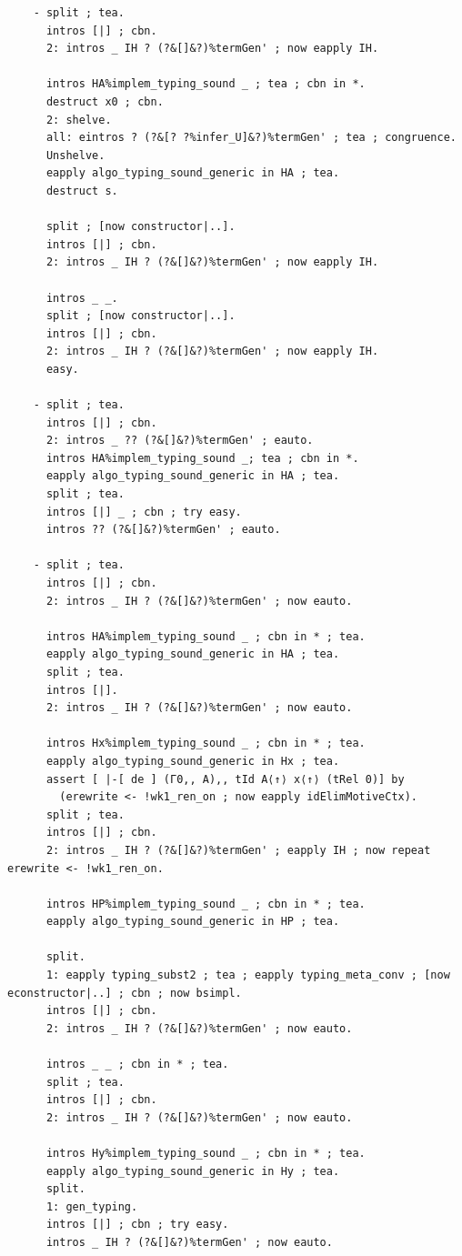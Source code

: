 \begin{lstlisting}
    - split ; tea.
      intros [|] ; cbn.
      2: intros _ IH ? (?&[]&?)%termGen' ; now eapply IH.
      
      intros HA%implem_typing_sound _ ; tea ; cbn in *.
      destruct x0 ; cbn.
      2: shelve.
      all: eintros ? (?&[? ?%infer_U]&?)%termGen' ; tea ; congruence.
      Unshelve.
      eapply algo_typing_sound_generic in HA ; tea.
      destruct s.

      split ; [now constructor|..].
      intros [|] ; cbn.
      2: intros _ IH ? (?&[]&?)%termGen' ; now eapply IH.

      intros _ _.
      split ; [now constructor|..].
      intros [|] ; cbn.
      2: intros _ IH ? (?&[]&?)%termGen' ; now eapply IH.
      easy.

    - split ; tea.
      intros [|] ; cbn.
      2: intros _ ?? (?&[]&?)%termGen' ; eauto.
      intros HA%implem_typing_sound _; tea ; cbn in *.
      eapply algo_typing_sound_generic in HA ; tea.
      split ; tea.
      intros [|] _ ; cbn ; try easy.
      intros ?? (?&[]&?)%termGen' ; eauto.

    - split ; tea.
      intros [|] ; cbn.
      2: intros _ IH ? (?&[]&?)%termGen' ; now eauto.

      intros HA%implem_typing_sound _ ; cbn in * ; tea.
      eapply algo_typing_sound_generic in HA ; tea.
      split ; tea.
      intros [|].
      2: intros _ IH ? (?&[]&?)%termGen' ; now eauto.

      intros Hx%implem_typing_sound _ ; cbn in * ; tea.
      eapply algo_typing_sound_generic in Hx ; tea.
      assert [ |-[ de ] (Γ0,, A),, tId A⟨↑⟩ x⟨↑⟩ (tRel 0)] by
        (erewrite <- !wk1_ren_on ; now eapply idElimMotiveCtx).
      split ; tea.
      intros [|] ; cbn.
      2: intros _ IH ? (?&[]&?)%termGen' ; eapply IH ; now repeat erewrite <- !wk1_ren_on.

      intros HP%implem_typing_sound _ ; cbn in * ; tea.
      eapply algo_typing_sound_generic in HP ; tea.

      split.
      1: eapply typing_subst2 ; tea ; eapply typing_meta_conv ; [now econstructor|..] ; cbn ; now bsimpl.
      intros [|] ; cbn.
      2: intros _ IH ? (?&[]&?)%termGen' ; now eauto.

      intros _ _ ; cbn in * ; tea.
      split ; tea.
      intros [|] ; cbn.
      2: intros _ IH ? (?&[]&?)%termGen' ; now eauto.

      intros Hy%implem_typing_sound _ ; cbn in * ; tea.
      eapply algo_typing_sound_generic in Hy ; tea.
      split.
      1: gen_typing.
      intros [|] ; cbn ; try easy.
      intros _ IH ? (?&[]&?)%termGen' ; now eauto.


\end{lstlisting}
